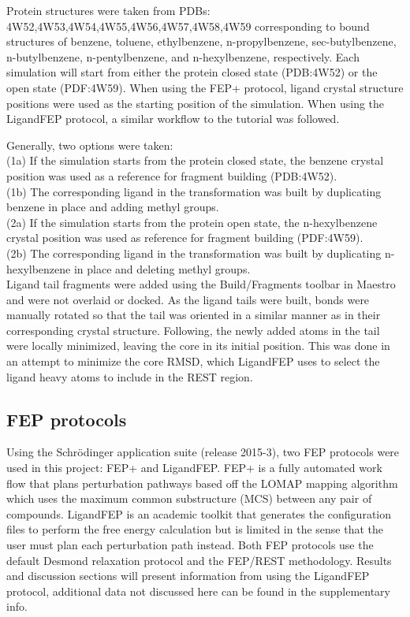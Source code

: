 \documentclass[journal=jctcce,manuscript=article]{achemso}
\begin{document}
Protein structures were taken from PDBs: 4W52,4W53,4W54,4W55,4W56,4W57,4W58,4W59 corresponding to bound structures of benzene, toluene, ethylbenzene, n-propylbenzene, sec-butylbenzene, n-butylbenzene, n-pentylbenzene, and n-hexylbenzene, respectively\cite{Merski2015}.
Each simulation will start from either the protein closed state (PDB:4W52) or the open state (PDF:4W59).
When using the FEP+ protocol, ligand crystal structure positions were used as the starting position of the simulation.
When using the LigandFEP protocol, a similar workflow to the tutorial\cite{LigandFEP} was followed.

Generally, two options were taken:\\
(1a) If the simulation starts from the protein closed state, the benzene crystal position was used as a reference for fragment building (PDB:4W52).\\
(1b) The corresponding ligand in the transformation was built by duplicating benzene in place and adding methyl groups.\\
(2a) If the simulation starts from the protein open state, the n-hexylbenzene crystal position was used as reference for fragment building (PDF:4W59).\\
(2b) The corresponding ligand in the transformation was built by duplicating n-hexylbenzene in place and deleting methyl groups.\\

Ligand tail fragments were added using the Build/Fragments toolbar in Maestro  and were not overlaid or docked. 
As the ligand tails were built, bonds were manually rotated so that the tail was oriented in a similar manner as in their corresponding crystal structure.
Following, the newly added atoms in the tail were locally minimized, leaving the core in its initial position.
This was done in an attempt to minimize the core RMSD, which LigandFEP uses to select the ligand heavy atoms to include in the REST region. 

\subsection*{FEP protocols}
Using the Schr\"{o}dinger application suite (release 2015-3)\cite{Maestro-Desmond}, two FEP protocols were used in this project: FEP+\cite{FEPplus} and LigandFEP\cite{LigandFEP}.
FEP+ is a fully automated work flow that plans perturbation pathways based off the LOMAP\cite{LOMAP} mapping algorithm which uses the maximum common substructure (MCS) between any pair of compounds.
LigandFEP is an academic toolkit that generates the configuration files to perform the free energy calculation but is limited in the sense that the user must plan each perturbation path instead.
Both FEP protocols use the default Desmond relaxation protocol and the FEP/REST methodology\cite{REST,REST2,FEP/REST,FEP/RESTapp}.
Results and discussion sections will present information from using the LigandFEP protocol, additional data not discussed here can be found in the supplementary info.
\end{document}

